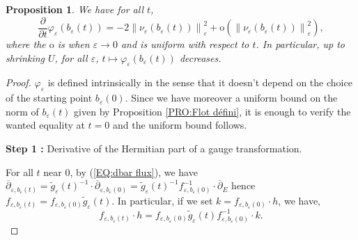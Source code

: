 \documentclass{article}
\newtheorem{proposition}[theorem]{Proposition}
\theoremstyle{remark}
\theoremstyle{definition}
\newcommand{\norme}[1]{\left\| #1 \right\|}
\newcommand{\dbar}{\overline{\partial}}
\begin{document}
\begin{proposition}\label{PRO:phi décroissante}
    We have for all $t$,
    $$
    \frac{\partial}{\partial t}\varphi_\varepsilon(b_\varepsilon(t)) = -2\norme{\nu_\varepsilon(b_\varepsilon(t))}_\varepsilon^2 + \mathrm{o}(\norme{\nu_\varepsilon(b_\varepsilon(t))}_\varepsilon^2),
    $$
    where the $\mathrm{o}$ is when $\varepsilon \rightarrow 0$ and is uniform with respect to $t$. In particular, up to shrinking $U$, for all $\varepsilon$, $t \mapsto \varphi_\varepsilon(b_\varepsilon(t))$ decreases.
\end{proposition}
\begin{proof}
$\varphi_\varepsilon$ is defined intrinsically in the sense that it doesn't depend on the choice of the starting point $b_\varepsilon(0)$. Since we have moreover a uniform bound on the norm of $b_\varepsilon(t)$ given by Proposition \ref{PRO:Flot défini}, it is enough to verify the wanted equality at $t = 0$ and the uniform bound follows.

\vspace{1mm}
\noindent\textbf{Step 1 :} Derivative of the Hermitian part of a gauge transformation.
\vspace{1mm}

For all $t$ near $0$, by (\ref{EQ:dbar flux}), we have $\dbar_{\varepsilon,b_\varepsilon(t)} = \tilde{g}_\varepsilon(t)^{-1} \cdot \dbar_{\varepsilon,b_\varepsilon(0)} = \tilde{g}_\varepsilon(t)^{-1}f_{\varepsilon,b_\varepsilon(0)}^{-1} \cdot \dbar_E$ hence $f_{\varepsilon,b_\varepsilon(t)} = f_{\varepsilon,b_\varepsilon(0)}\tilde{g}_\varepsilon(t)$. In particular, if we set $k = f_{\varepsilon,b_\varepsilon(0)} \cdot h$, we have,
$$
f_{\varepsilon,b_\varepsilon(t)} \cdot h = f_{\varepsilon,b_\varepsilon(0)}\tilde{g}_\varepsilon(t)f_{\varepsilon,b_\varepsilon(0)}^{-1} \cdot k.
$$


\end{proof}
\end{document}
